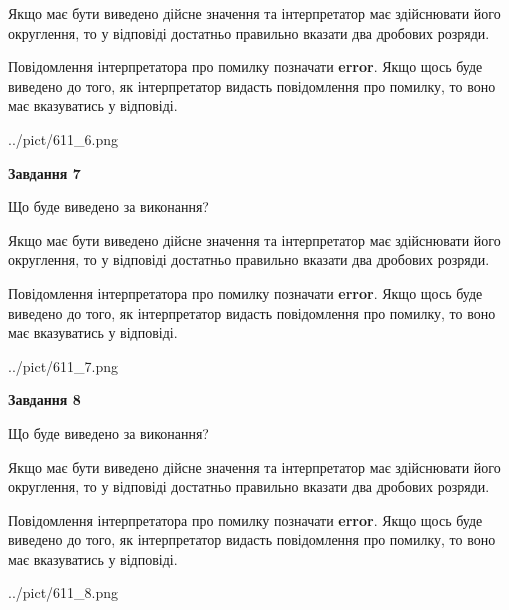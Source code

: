 \documentclass[12pt, ukrainian]{article}
\begin{document}
{\begin {Large}
Якщо має бути виведено дійсне значення та інтерпретатор має здійснювати його округлення, 
то у відповіді достатньо правильно вказати два дробових розряди.

Повідомлення інтерпретатора про помилку позначати \textbf{error}.
Якщо щось буде виведено до того, як інтерпретатор видасть повідомлення про помилку, 
то воно має вказуватись у відповіді. \par

\begin{center}
	{../pict/611_6.png}
\end{center}
\newpage

{\begin {center}\textbf{Завдання 7}\end {center}}\par
Що буде виведено за виконання? \par

Якщо має бути виведено дійсне значення та інтерпретатор має здійснювати його округлення, 
то у відповіді достатньо правильно вказати два дробових розряди.

Повідомлення інтерпретатора про помилку позначати \textbf{error}.
Якщо щось буде виведено до того, як інтерпретатор видасть повідомлення про помилку, 
то воно має вказуватись у відповіді. \par

\begin{center}
	{../pict/611_7.png}
\end{center}
\newpage

{\begin {center}\textbf{Завдання 8}\end {center}}\par
Що буде виведено за виконання? \par

Якщо має бути виведено дійсне значення та інтерпретатор має здійснювати його округлення, 
то у відповіді достатньо правильно вказати два дробових розряди.

Повідомлення інтерпретатора про помилку позначати \textbf{error}.
Якщо щось буде виведено до того, як інтерпретатор видасть повідомлення про помилку, 
то воно має вказуватись у відповіді. \par

\begin{center}
	{../pict/611_8.png}
\end{center}
\newpage


\end{Large}}
\end{document}
